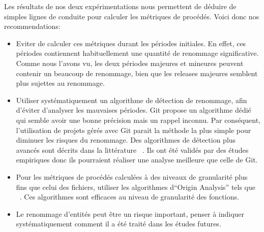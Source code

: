 Les résultats de nos deux expérimentations nous permettent de déduire de simples lignes de conduite pour calculer les métriques de procédés. Voici donc nos recommendations: 
\begin{itemize}
\item Eviter de calculer ces métriques durant les périodes initiales. En effet, ces périodes contiennent habituellement une quantité de renommage significative. Comme nous l'avons vu, les deux périodes majeures et mineures peuvent contenir un beaucoup de renommage, bien que les releases majeures semblent plus sujettes au renommage. 
\item Utiliser systématiquement un algorithme de détection de renommage, afin d'éviter d'analyser les mauvaises périodes. Git propose un algorithme dédié qui semble avoir une bonne précision mais un rappel inconnu. Par conséquent, l'utilisation de projets gérés avec Git parait la méthode la plus simple pour diminuer les risques du renommage. Des algorithmes de détection plus avancés sont décrits dans la littérature ~\cite{antoniol_automatic_2004,lavoie_inferring_2012,steidl_incremental_2014}. Ils ont été validés par des études empiriques donc ils pourraient réaliser une analyse meilleure que celle de Git. 
\item Pour les métriques de procédés calculées à des niveaux de granularité plus fins que celui des fichiers, utiliser les algorithmes d``Origin Analysis'' tels que ~\cite{wu_aura:_2010}. Ces algorithmes sont efficaces au niveau de granularité des fonctions.
\item Le renommage d'entités peut être un risque important, penser à indiquer systématiquement comment il a été traité dans les études futures.\\       
\end{itemize}
